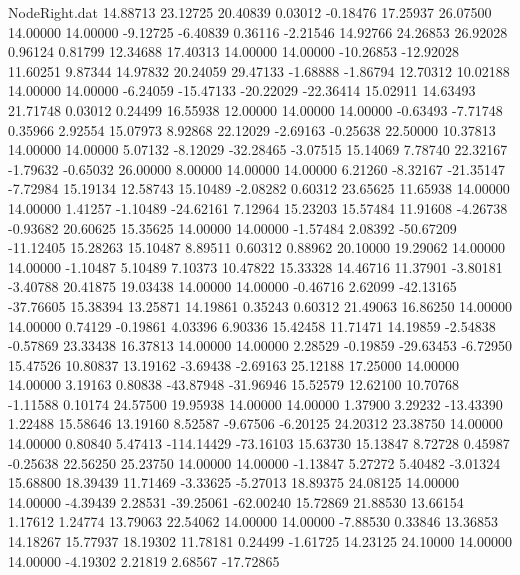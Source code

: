 \begin{filecontents}{NodeRight.dat}
  14.88713   23.12725   20.40839     0.03012   -0.18476   17.25937   26.07500   14.00000   14.00000   -9.12725   -6.40839    0.36116   -2.21546
  14.92766   24.26853   26.92028     0.96124    0.81799   12.34688   17.40313   14.00000   14.00000  -10.26853  -12.92028   11.60251    9.87344
  14.97832   20.24059   29.47133    -1.68888   -1.86794   12.70312   10.02188   14.00000   14.00000   -6.24059  -15.47133  -20.22029  -22.36414
  15.02911   14.63493   21.71748     0.03012    0.24499   16.55938   12.00000   14.00000   14.00000   -0.63493   -7.71748    0.35966    2.92554
  15.07973    8.92868   22.12029    -2.69163   -0.25638   22.50000   10.37813   14.00000   14.00000    5.07132   -8.12029  -32.28465   -3.07515
  15.14069    7.78740   22.32167    -1.79632   -0.65032   26.00000    8.00000   14.00000   14.00000    6.21260   -8.32167  -21.35147   -7.72984
  15.19134   12.58743   15.10489    -2.08282    0.60312   23.65625   11.65938   14.00000   14.00000    1.41257   -1.10489  -24.62161    7.12964
  15.23203   15.57484   11.91608    -4.26738   -0.93682   20.60625   15.35625   14.00000   14.00000   -1.57484    2.08392  -50.67209  -11.12405
  15.28263   15.10487    8.89511     0.60312    0.88962   20.10000   19.29062   14.00000   14.00000   -1.10487    5.10489    7.10373   10.47822
  15.33328   14.46716   11.37901    -3.80181   -3.40788   20.41875   19.03438   14.00000   14.00000   -0.46716    2.62099  -42.13165  -37.76605
  15.38394   13.25871   14.19861     0.35243    0.60312   21.49063   16.86250   14.00000   14.00000    0.74129   -0.19861    4.03396    6.90336
  15.42458   11.71471   14.19859    -2.54838   -0.57869   23.33438   16.37813   14.00000   14.00000    2.28529   -0.19859  -29.63453   -6.72950
  15.47526   10.80837   13.19162    -3.69438   -2.69163   25.12188   17.25000   14.00000   14.00000    3.19163    0.80838  -43.87948  -31.96946
  15.52579   12.62100   10.70768    -1.11588    0.10174   24.57500   19.95938   14.00000   14.00000    1.37900    3.29232  -13.43390    1.22488
  15.58646   13.19160    8.52587    -9.67506   -6.20125   24.20312   23.38750   14.00000   14.00000    0.80840    5.47413 -114.14429  -73.16103
  15.63730   15.13847    8.72728     0.45987   -0.25638   22.56250   25.23750   14.00000   14.00000   -1.13847    5.27272    5.40482   -3.01324
  15.68800   18.39439   11.71469    -3.33625   -5.27013   18.89375   24.08125   14.00000   14.00000   -4.39439    2.28531  -39.25061  -62.00240
  15.72869   21.88530   13.66154     1.17612    1.24774   13.79063   22.54062   14.00000   14.00000   -7.88530    0.33846   13.36853   14.18267
  15.77937   18.19302   11.78181     0.24499   -1.61725   14.23125   24.10000   14.00000   14.00000   -4.19302    2.21819    2.68567  -17.72865

\end{filecontents}
